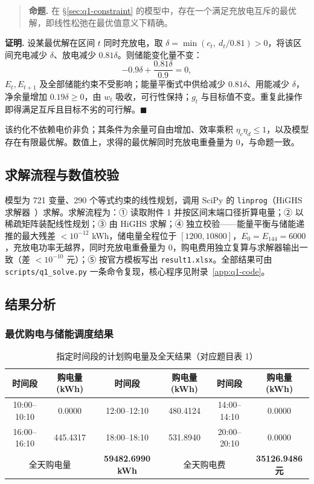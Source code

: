 \begin{quote}
  \textbf{命题.} 在 \S\ref{sec:q1-constraint} 的模型中，存在一个满足充放电互斥的最优解，即线性松弛在最优值意义下精确。
\end{quote}

\textbf{证明.} 设某最优解在区间 $t$ 同时充放电，取 $\delta=\min(c_t,\ d_t/0.81)>0$，将该区间充电减少 $\delta$、放电减少 $0.81\delta$。则储能变化量不变：
\begin{equation}
  -0.9\delta+\frac{0.81\delta}{0.9}=0,
\end{equation}
$E_t,E_{t+1}$ 及全部储能约束不受影响；能量平衡式中供给减少 $0.81\delta$、用能减少 $\delta$，净余量增加 $0.19\delta\ge0$，由 $w_t$ 吸收，可行性保持；$g_t$ 与目标值不变。重复此操作即得满足互斥且目标不劣的可行解。$\blacksquare$

该约化不依赖电价非负；其条件为余量可自由增加、效率乘积 $\eta_c\eta_d\le1$，以及模型存在有限最优解。数值上，求得的最优解同时充放电重叠量为 0，与命题一致。

\subsection{求解流程与数值校验}

模型为 721 变量、290 个等式约束的线性规划，调用 SciPy 的 \texttt{linprog}（HiGHS 求解器~\cite{highs,scipy}）求解。求解流程为：① 读取附件 1 并按区间末端口径折算电量；② 以稀疏矩阵装配线性规划；③ 由 HiGHS 求解；④ 独立校验——能量平衡与储能递推的最大残差 $<10^{-12}$ kWh，储电量全程位于 $[1200,10800]$，$E_0=E_{144}=6000$，充放电功率无越界，同时充放电重叠量为 0，购电费用独立复算与求解器输出一致（差 $<10^{-10}$ 元）；⑤ 按官方模板写出 \texttt{result1.xlsx}。全部结果可由 \texttt{scripts/q1\_solve.py} 一条命令复现，核心程序见附录~\ref{app:q1-code}。

\subsection{结果分析}

\subsubsection{最优购电与储能调度结果}

\begin{table}[htbp]
  \centering
  \caption{指定时间段的计划购电量及全天结果（对应题目表 1）}
  \label{tab:q1-t1}
  \small
  \setlength{\tabcolsep}{4pt}
  \begin{tabular}{|c|c|c|c|c|c|}
    \hline
    时间段 & 购电量 (kWh) & 时间段 & 购电量 (kWh) & 时间段 & 购电量 (kWh) \\ \hline
    10:00--10:10 & 0.0000 & 12:00--12:10 & 480.4124 & 14:00--14:10 & 0.0000 \\ \hline
    16:00--16:10 & 445.4317 & 18:00--18:10 & 531.8940 & 20:00--20:10 & 0.0000 \\ \hline
    \multicolumn{2}{|c|}{全天购电量} & \textbf{59482.6990 kWh}
      & \multicolumn{2}{c|}{全天购电费} & \textbf{35126.9486 元} \\ \hline
  \end{tabular}
\end{table}

